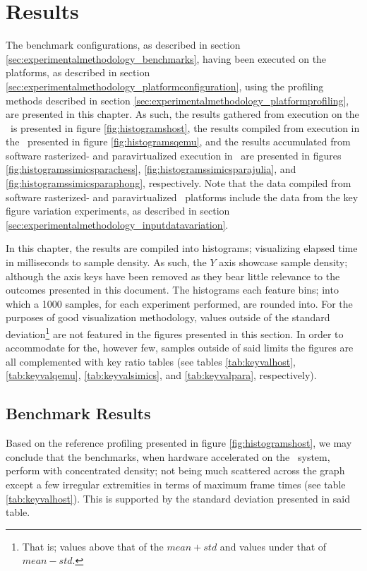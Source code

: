 
\chapter{Results}
\label{cha:results}
The benchmark configurations, as described in section \ref{sec:experimentalmethodology_benchmarks}, having been executed on the platforms, as described in section \ref{sec:experimentalmethodology_platformconfiguration}, using the profiling methods described in section \ref{sec:experimentalmethodology_platformprofiling}, are presented in this chapter.
As such, the results gathered from execution on the \dvttermhost\ is presented in figure \ref{fig:histogramshost}, the results compiled from execution in the \dvttermandroidemulator\ presented in figure \ref{fig:histogramsqemu}, and the results accumulated from software rasterized- and paravirtualized execution in \dvttermsimics\ are presented in figures \ref{fig:histogramssimicsparachess}, \ref{fig:histogramssimicsparajulia}, and \ref{fig:histogramssimicsparaphong}, respectively.
Note that the data compiled from software rasterized- and paravirtualized \dvttermsimics\ platforms include the data from the key figure variation experiments, as described in section \ref{sec:experimentalmethodology_inputdatavariation}.

In this chapter, the results are compiled into histograms; visualizing elapsed time in milliseconds to sample density.
As such, the $Y$ axis showcase sample density; although the axis keys have been removed as they bear little relevance to the outcomes presented in this document.
The histograms each feature  bins; into which a 1000 samples, for each experiment performed, are rounded into.
For the purposes of good visualization methodology, values outside of the standard deviation\footnote{That is; values above that of the $mean + std$ and values under that of $mean - std$.} are not featured in the figures presented in this section.
In order to accommodate for the, however few, samples outside of said limits the figures are all complemented with key ratio tables (see tables \ref{tab:keyvalhost}, \ref{tab:keyvalqemu}, \ref{tab:keyvalsimics}, and \ref{tab:keyvalpara}, respectively).

\section{Benchmark Results}
\label{sec:results_benchmarkresults}
Based on the reference profiling presented in figure \ref{fig:histogramshost}, we may conclude that the benchmarks, when hardware accelerated on the \dvttermhost\ system, perform with concentrated density; not being much scattered across the graph except a few irregular extremities in terms of maximum frame times (see table \ref{tab:keyvalhost}).
This is supported by the standard deviation presented in said table.

